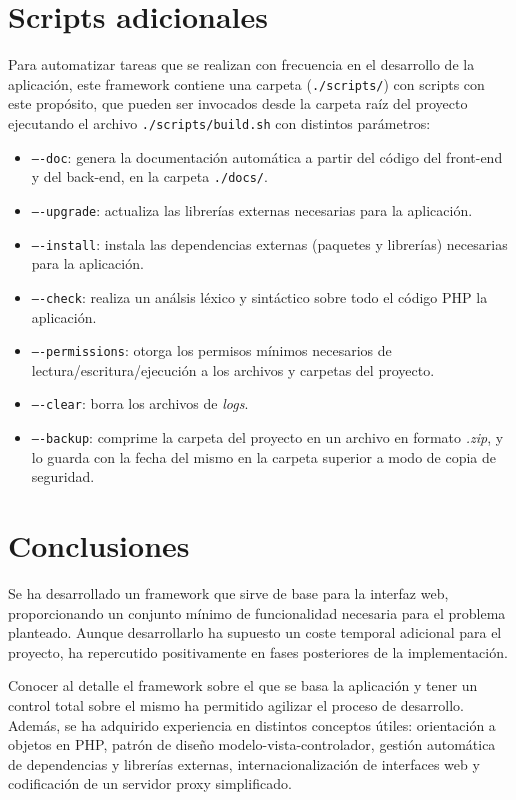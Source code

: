 \section{Scripts adicionales\label{extra:mvc:scripts}}

Para automatizar tareas que se realizan con frecuencia en el desarrollo de la aplicación, este \gls{framework} contiene una carpeta (\texttt{./scripts/}) con \glspl{script} con este propósito, que pueden ser invocados desde la carpeta raíz del proyecto ejecutando el archivo \texttt{./scripts/build.sh} con distintos parámetros:
\begin{itemize}
  \item \texttt{----doc}: genera la documentación automática a partir del código del \gls{front-end} y del \gls{back-end}, en la carpeta \texttt{./docs/}.
  \item \texttt{----upgrade}: actualiza las librerías externas necesarias para la aplicación.
  \item \texttt{----install}: instala las dependencias externas (paquetes y librerías) necesarias para la aplicación.
  \item \texttt{----check}: realiza un análsis léxico y sintáctico sobre todo el código \gls{PHP} la aplicación. 
  \item \texttt{----permissions}: otorga los permisos mínimos necesarios de lectura/escritura/ejecución a los archivos y carpetas del proyecto.
  \item \texttt{----clear}: borra los archivos de \textit{logs}.
  \item \texttt{----backup}: comprime la carpeta del proyecto en un archivo en formato \textit{.zip}, y lo guarda con la fecha del mismo en la carpeta superior a modo de copia de seguridad.
\end{itemize}

\section{Conclusiones\label{extra:mvc:conclusiones}}

Se ha desarrollado un \gls{framework} que sirve de base para la interfaz web, proporcionando un conjunto mínimo de funcionalidad necesaria para el problema planteado. Aunque desarrollarlo ha supuesto un coste temporal adicional para el proyecto, ha repercutido positivamente en fases posteriores de la implementación.

Conocer al detalle el \gls{framework} sobre el que se basa la aplicación y tener un control total sobre el mismo ha permitido agilizar el proceso de desarrollo. Además, se ha adquirido experiencia en distintos conceptos útiles: orientación a objetos en \gls{PHP}, patrón de diseño modelo-vista-controlador, gestión automática de dependencias y librerías externas, internacionalización de interfaces web y codificación de un servidor \gls{proxy} simplificado.